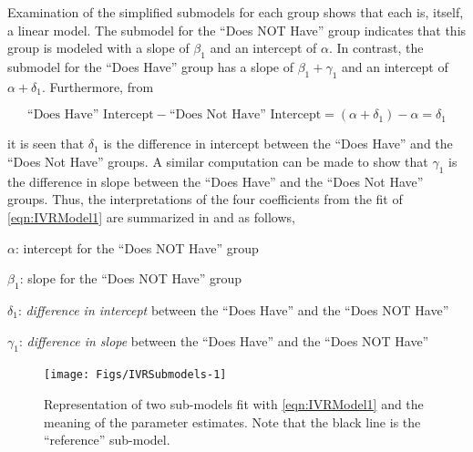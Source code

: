 \documentclass[10pt,openany]{book}\usepackage[]{graphicx}\usepackage[]{color}
\newenvironment{knitrout}{}{} %
\begin{document}

Examination of the simplified submodels for each group shows that each is, itself, a linear model.  The submodel for the ``Does NOT Have'' group indicates that this group is modeled with a slope of $\beta_{1}$ and an intercept of $\alpha$.  In contrast, the submodel for the ``Does Have'' group has a slope of $\beta_{1}+\gamma_{1}$ and an intercept of $\alpha+\delta_{1}$.  Furthermore, from

\[
  \text{``Does Have'' Intercept} - \text{``Does Not Have'' Intercept} = (\alpha+\delta_{1}) - \alpha = \delta_{1}
\]

it is seen that $\delta_{1}$ is the difference in intercept between the ``Does Have'' and the ``Does Not Have'' groups.  A similar computation can be made to show that $\gamma_{1}$ is the difference in slope between the ``Does Have'' and the ``Does Not Have'' groups.  Thus, the interpretations of the four coefficients from the fit of \eqref{eqn:IVRModel1} are summarized in  and as follows,

\begin{Itemize}
  \item $\alpha$: intercept for the ``Does NOT Have'' group
  \item $\beta_{1}$: slope for the ``Does NOT Have'' group
  \item $\delta_{1}$: \emph{difference in intercept} between the ``Does Have'' and the ``Does NOT Have''
  \item $\gamma_{1}$: \emph{difference in slope} between the ``Does Have'' and the ``Does NOT Have''
\end{Itemize}

\begin{knitrout}
\color{fgcolor}\begin{figure}[h]

{\centering \texttt{[image: Figs/IVRSubmodels-1]} 

}

\caption[IVR fit and parameter meanings.]{Representation of two sub-models fit with \eqref{eqn:IVRModel1} and the meaning of the parameter estimates.  Note that the black line is the ``reference'' sub-model.}\label{fig:IVRSubmodels}
\end{figure}


\end{knitrout}
\end{document}
